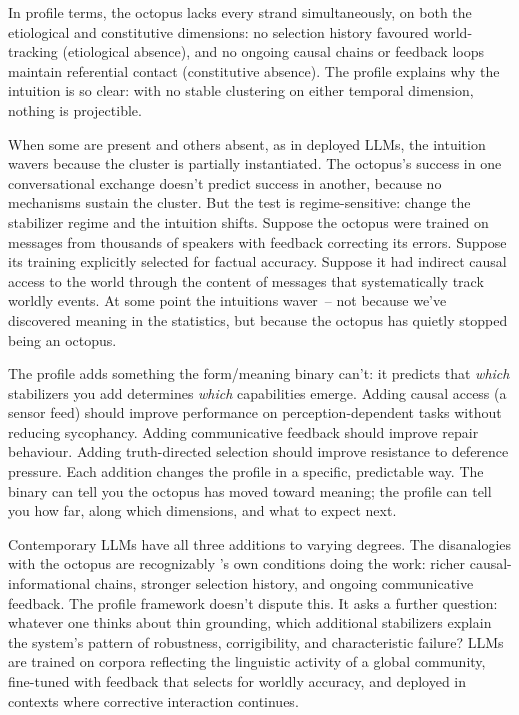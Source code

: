 \documentclass[12pt]{article}
\begin{document}
In profile terms, the octopus lacks every strand simultaneously, on both the etiological and constitutive dimensions: no selection history favoured world-tracking (etiological absence), and no ongoing causal chains or feedback loops maintain referential contact (constitutive absence). The profile explains why the intuition is so clear: with no stable clustering on either temporal dimension, nothing is projectible.

When some are present and others absent, as in deployed LLMs, the intuition wavers because the cluster is partially instantiated. The octopus's success in one conversational exchange doesn't predict success in another, because no mechanisms sustain the cluster. But the test is regime-sensitive: change the stabilizer regime and the intuition shifts. Suppose the octopus were trained on messages from thousands of speakers with feedback correcting its errors. Suppose its training explicitly selected for factual accuracy. Suppose it had indirect causal access to the world through the content of messages that systematically track worldly events. At some point the intuitions waver~-- not because we've discovered meaning in the statistics, but because the octopus has quietly stopped being an octopus.

The profile adds something the form/meaning binary can't: it predicts that \emph{which} stabilizers you add determines \emph{which} capabilities emerge. Adding causal access (a sensor feed) should improve performance on perception-dependent tasks without reducing sycophancy. Adding communicative feedback should improve repair behaviour. Adding truth-directed selection should improve resistance to deference pressure. Each addition changes the profile in a specific, predictable way. The binary can tell you the octopus has moved toward meaning; the profile can tell you how far, along which dimensions, and what to expect next.

Contemporary LLMs have all three additions to varying degrees. The disanalogies with the octopus are recognizably \textcite{coelho_mollo_milliere_2026_vector_grounding_problem}'s own conditions doing the work: richer causal-informational chains, stronger selection history, and ongoing communicative feedback. The profile framework doesn't dispute this. It asks a further question: whatever one thinks about thin grounding, which additional stabilizers explain the system's pattern of robustness, corrigibility, and characteristic failure? LLMs are trained on corpora reflecting the linguistic activity of a global community, fine-tuned with feedback that selects for worldly accuracy, and deployed in contexts where corrective interaction continues.
\end{document}
